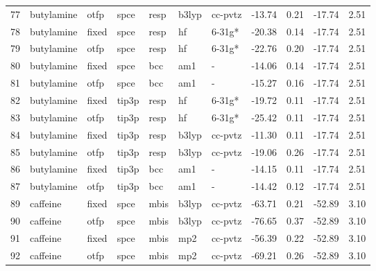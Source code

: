 \begin{tabular}{lllllllrrrr}
77  &                    butylamine &   otfp &   spce &   resp &   b3lyp &      cc-pvtz &      -13.74 &     0.21 &      -17.74 &      2.51 \\
78  &                    butylamine &  fixed &   spce &   resp &      hf &       6-31g* &      -20.38 &     0.14 &      -17.74 &      2.51 \\
79  &                    butylamine &   otfp &   spce &   resp &      hf &       6-31g* &      -22.76 &     0.20 &      -17.74 &      2.51 \\
80  &                    butylamine &  fixed &   spce &    bcc &     am1 &            - &      -14.06 &     0.14 &      -17.74 &      2.51 \\
81  &                    butylamine &   otfp &   spce &    bcc &     am1 &            - &      -15.27 &     0.16 &      -17.74 &      2.51 \\
82  &                    butylamine &  fixed &  tip3p &   resp &      hf &       6-31g* &      -19.72 &     0.11 &      -17.74 &      2.51 \\
83  &                    butylamine &   otfp &  tip3p &   resp &      hf &       6-31g* &      -25.42 &     0.11 &      -17.74 &      2.51 \\
84  &                    butylamine &  fixed &  tip3p &   resp &   b3lyp &      cc-pvtz &      -11.30 &     0.11 &      -17.74 &      2.51 \\
85  &                    butylamine &   otfp &  tip3p &   resp &   b3lyp &      cc-pvtz &      -19.06 &     0.26 &      -17.74 &      2.51 \\
86  &                    butylamine &  fixed &  tip3p &    bcc &     am1 &            - &      -14.15 &     0.11 &      -17.74 &      2.51 \\
87  &                    butylamine &   otfp &  tip3p &    bcc &     am1 &            - &      -14.42 &     0.12 &      -17.74 &      2.51 \\
89  &                      caffeine &  fixed &   spce &   mbis &   b3lyp &      cc-pvtz &      -63.71 &     0.21 &      -52.89 &      3.10 \\
90  &                      caffeine &   otfp &   spce &   mbis &   b3lyp &      cc-pvtz &      -76.65 &     0.37 &      -52.89 &      3.10 \\
91  &                      caffeine &  fixed &   spce &   mbis &     mp2 &      cc-pvtz &      -56.39 &     0.22 &      -52.89 &      3.10 \\
92  &                      caffeine &   otfp &   spce &   mbis &     mp2 &      cc-pvtz &      -69.21 &     0.26 &      -52.89 &      3.10 \\

\end{tabular}
